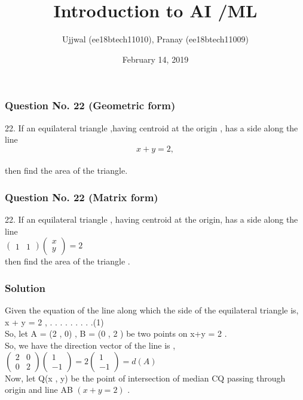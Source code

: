 \documentclass{beamer}
\title[Short title]{Introduction to AI /ML }
\author{Ujjwal (ee18btech11010), Pranay (ee18btech11009)}
\institute[IITH] 
{
Indian Institute of Technology\\ 
\medskip
\textit{hyderabad}
}
\date{February 14, 2019}
\begin{document}
\begin{frame}
\titlepage 
\end{frame}

\begin{frame}
\frametitle{Question No. 22 (Geometric form)} 
22.  If an equilateral triangle ,having centroid at the origin , has a side along the line \\
           \[ x + y = 2,\]\\ then find the area of the triangle.
\end{frame}


\begin{frame}
\frametitle{Question No. 22 (Matrix form)}
22. If an equilateral triangle , having centroid at the origin, has a side along the line 
\\
\quad \quad\quad\quad\quad \quad\quad\quad \quad\quad $\begin{pmatrix}
 1 & 1 
\end{pmatrix}
\begin{pmatrix}
 x \\ y 
\end{pmatrix} = 2 $
\\
then find the area of the triangle .

\end{frame}


\begin{frame}
\frametitle{Solution}
Given the equation of the line along which the side of the equilateral triangle is,
\\  \quad \quad \quad \quad \quad \quad \quad x + y = 2 , \quad \quad \quad \quad \quad  . . . . . . . . .(1)\\ So, let  A = (2 , 0)  , B = (0 , 2 ) be two points on  x+y = 2 .\\
So, we have the direction vector of the line is ,\\
\quad \quad \quad \quad \quad \quad \quad \quad   $ \begin{pmatrix}
2 & 0\\ 0 & 2 
\end{pmatrix}
\begin{pmatrix}
1 \\ -1 
\end{pmatrix} 
=
2 \begin{pmatrix}
1 \\ -1 

\end{pmatrix}
= d (A) $\\ 
\quad Now, let Q(x , y) be the point of intersection of median CQ passing through origin and line AB  $ (x+y = 2) $ .
\end{frame}
\end{document}
